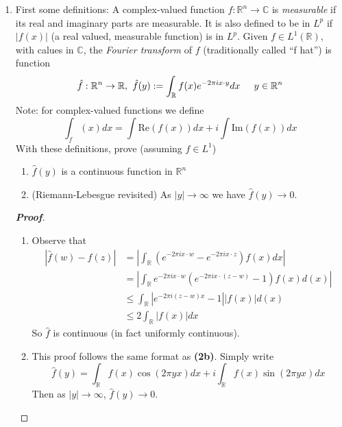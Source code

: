 \documentclass[12pt,leqno]{book}
\theoremstyle{definition}
\newcommand{\R}{\mathbb{R}}
\newcommand{\C}{\mathbb{C}}
\newenvironment{Proof}{\begin{proof}[\textnormal{\textbf{Proof}}]}{\end{proof}}
\begin{document}
\begin{enumerate}
\begin{Proof}
On the other hand, if this value is finite, then, for every $\epsilon>0$, there is a Riemann sum of the function $f^p$ which is less than $\epsilon$, hence $f^p\in L^1(\R)$. Thus, $f\in L^p(\R)$. 
\end{Proof}


 \item First some definitions: A complex-valued function $f:\R^n\to\C$ is \textit{measurable} if its real and imaginary parts are measurable. It is also defined to be in $L^p$ if $|f(x)|$ (a real valued, measurable function) is in $L^p$. Given $f\in L^1(\R)$, with calues in $\C$, the \textit{Fourier transform} of $f$ (traditionally called ``f hat'') is function \[\hat{f}:\R^n\to\R,\hskip.05in \hat{f}(y):=\int_{\R}f(x)e^{-2\pi ix\cdot y}dx\hskip.2in y\in\R^n\] Note: for complex-valued functions we define \[\int_f(x)dx=\int\text{Re}(f(x))dx+i\int\text{Im}(f(x))dx\] With these definitions, prove (assuming $f\in L^1$)
  \begin{enumerate}
   \item $\hat{f}(y)$ is a continuous function in $\R^n$
   \item (Riemann-Lebesgue revisited) As $|y|\to\infty$ we have $\hat{f}(y)\to0$. 
  \end{enumerate}

\begin{Proof}\indent
 \begin{enumerate}
  \item Observe that \begin{align*}\left|\hat{f}(w)-\hat{f}(z)\right|&=\left|\int_{\R}\left(e^{-2\pi ix\cdot w}-e^{-2\pi ix\cdot z}\right)f(x)dx\right|\\&=\left|\int_{\R}e^{-2\pi ix\cdot w}\left(e^{-2\pi ix\cdot(z-w)}-1\right)f(x)d(x)\right|\\&\leq\int_{\R}\left|e^{-2\pi i(z-w)x}-1\right||f(x)|d(x)\\&\leq2\int_{\R}|f(x)|dx\end{align*} So $\hat{f}$ is continuous (in fact uniformly continuous).
  \item This proof follows the same format as \textbf{(2b)}. Simply write \[\hat{f}(y)=\int_{\R}f(x)\cos(2\pi yx)dx+i\int_{\R}f(x)\sin(2\pi yx)dx\] Then as $|y|\to\infty$, $\hat{f}(y)\to0$.
 \end{enumerate}

\end{Proof}

\end{enumerate}
\end{document}
